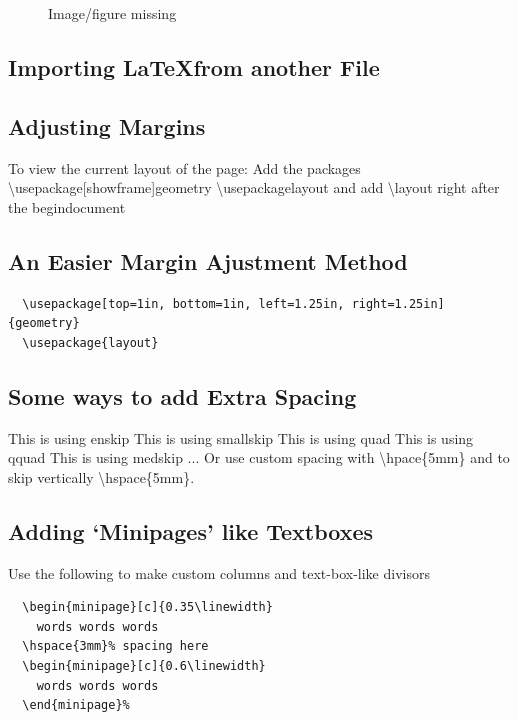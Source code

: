 \documentclass[12pt,twoside,a4paper]{article}
\begin{document}
\begin{figure}[htbp]
  \centering
  \caption{Image/figure missing}
\end{figure}

\newpage
\subsection*{Importing \LaTeX from another File}

\subsection*{Adjusting Margins}
To view the current layout of the page:
Add the packages
\textbackslash usepackage[showframe]{geometry}
\textbackslash usepackage{layout}
and add \textbackslash layout right after the begin{document}

\subsection*{An Easier Margin Ajustment Method}
\begin{verbatim}
  \usepackage[top=1in, bottom=1in, left=1.25in, right=1.25in]{geometry}
  \usepackage{layout}

\end{verbatim}

\subsection*{Some ways to add Extra Spacing}
This is using enskip \enskip This is using smallskip \smallskip This is using quad \quad This is using qquad \qquad This is using medskip \medskip ...
Or use custom spacing with \textbackslash hpace\{5mm\} and to skip vertically \textbackslash hspace\{5mm\}.

\newpage
\subsection*{Adding `Minipages' like Textboxes}
Use the following to make custom columns and text-box-like divisors
\begin{verbatim}
  \begin{minipage}[c]{0.35\linewidth}
    words words words
  \hspace{3mm}% spacing here
  \begin{minipage}[c]{0.6\linewidth}
    words words words
  \end{minipage}%
\end{verbatim}
\end{document}
